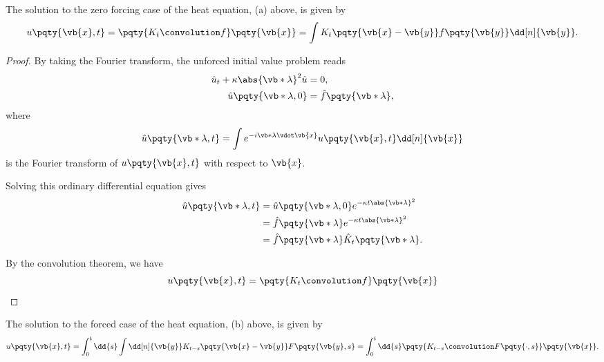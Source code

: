 \begin{proposition}
    The solution to the zero forcing case of the heat equation, (a) above, is given by
    \begin{equation}
        u\pqty{\vb{x}, t} = \pqty{K_t \convolution f} \pqty{\vb{x}} = \int K_t \pqty{\vb{x} - \vb{y}} f\pqty{\vb{y}} \dd[n]{\vb{y}}.
    \end{equation}
\end{proposition}

\begin{proof}
    By taking the Fourier transform, the unforced initial value problem reads
    \begin{subequations}
        \begin{align}
            \hat{u}_t + \kappa \abs{\vb*{\lambda}}^2 \hat{u} &= 0, \\
            \hat{u} \pqty{\vb*{\lambda}, 0} &= \hat{f} \pqty{\vb*{\lambda}},
        \end{align}
    \end{subequations}
    where
    \begin{equation}
        \hat{u} \pqty{\vb*{\lambda}, t} = \int e^{- i \vb*{\lambda} \vdot \vb{x}} u\pqty{\vb{x}, t} \dd[n]{\vb{x}}
    \end{equation}
    is the Fourier transform of \(u\pqty{\vb{x}, t}\) with respect to \(\vb{x}\).

    Solving this ordinary differential equation gives
    \begin{subequations}
        \begin{align}
            \hat{u} \pqty{\vb*{\lambda}, t} &= \hat{u} \pqty{\vb*{\lambda}, 0} e^{- \kappa t \abs{\vb*{\lambda}}^2} \\
            &= \hat{f} \pqty{\vb*{\lambda}} e^{- \kappa t \abs{\vb*{\lambda}}^2} \\
            &= \hat{f} \pqty{\vb*{\lambda}} \hat{K}_t \pqty{\vb*{\lambda}}.
        \end{align}
    \end{subequations}

    By the convolution theorem, we have
    \begin{equation}
        u \pqty{\vb{x}, t} = \pqty{K_t \convolution f} \pqty{\vb{x}}
    \end{equation}
\end{proof}

\begin{proposition}
    The solution to the forced case of the heat equation, (b) above, is given by
    \begin{equation}
        u\pqty{\vb{x}, t} = \int_{0}^{t} \dd{s} \int \dd[n]{\vb{y}} K_{t - s} \pqty{\vb{x} - \vb{y}} F\pqty{\vb{y}, s} = \int_{0}^{t} \dd{s} \pqty{K_{t - s} \convolution F\pqty{\cdot, s}} \pqty{\vb{x}}.
    \end{equation}
\end{proposition}

